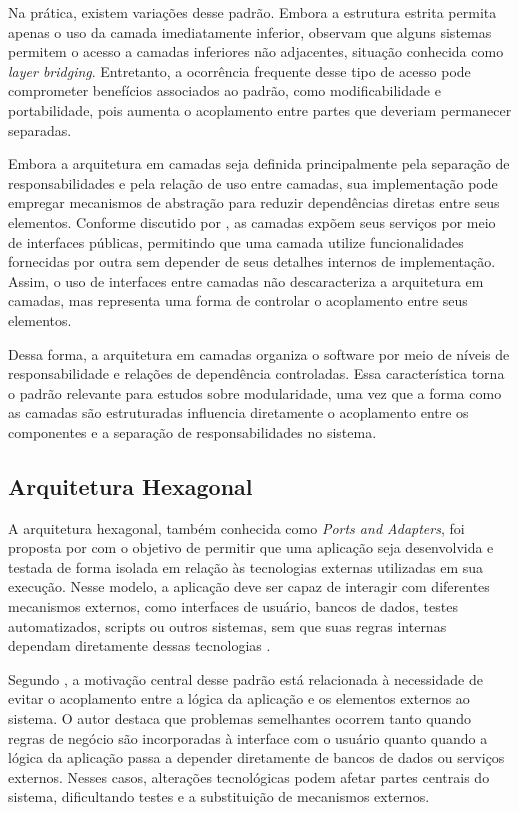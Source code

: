 Na prática, existem variações desse padrão. Embora a estrutura estrita permita apenas o uso da camada imediatamente inferior,
 observam que alguns sistemas permitem o acesso a camadas inferiores não adjacentes, situação conhecida
como \textit{layer bridging}. Entretanto, a ocorrência frequente desse tipo de acesso pode comprometer benefícios associados
ao padrão, como modificabilidade e portabilidade, pois aumenta o acoplamento entre partes que deveriam permanecer separadas.

Embora a arquitetura em camadas seja definida principalmente pela separação de responsabilidades e pela relação de uso entre 
camadas, sua implementação pode empregar mecanismos de abstração para reduzir dependências diretas entre seus elementos. 
Conforme discutido por , as camadas expõem seus serviços por meio de interfaces públicas, permitindo que 
uma camada utilize funcionalidades fornecidas por outra sem depender de seus detalhes internos de implementação. Assim, o uso 
de interfaces entre camadas não descaracteriza a arquitetura em camadas, mas representa uma forma de controlar o acoplamento 
entre seus elementos.

Dessa forma, a arquitetura em camadas organiza o software por meio de níveis de responsabilidade e relações de dependência controladas.
Essa característica torna o padrão relevante para estudos sobre modularidade, uma vez que a forma como as camadas são estruturadas
influencia diretamente o acoplamento entre os componentes e a separação de responsabilidades no sistema.

\subsection{Arquitetura Hexagonal}
\label{sec:arquitetura-hexagonal}

A arquitetura hexagonal, também conhecida como \textit{Ports and Adapters}, foi proposta por  com 
o objetivo de permitir que uma aplicação seja desenvolvida e testada de forma isolada em relação às tecnologias externas 
utilizadas em sua execução. Nesse modelo, a aplicação deve ser capaz de interagir com diferentes mecanismos externos, como 
interfaces de usuário, bancos de dados, testes automatizados, scripts ou outros sistemas, sem que suas regras internas dependam
diretamente dessas tecnologias \cite{cockburn2005}.

Segundo , a motivação central desse padrão está relacionada à necessidade de evitar o acoplamento entre a 
lógica da aplicação e os elementos externos ao sistema. O autor destaca que problemas semelhantes ocorrem tanto quando regras de negócio 
são incorporadas à interface com o usuário quanto quando a lógica da aplicação passa a depender diretamente de bancos de dados ou serviços 
externos. Nesses casos, alterações tecnológicas podem afetar partes centrais do sistema, dificultando testes e a substituição de mecanismos 
externos.

